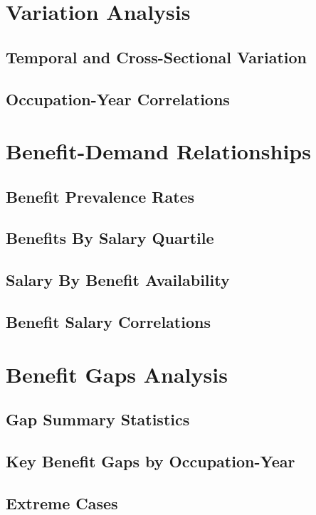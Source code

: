 \documentclass{article}
\begin{document}
\section{Variation Analysis}
\subsection{Temporal and Cross-Sectional Variation}


\subsection{Occupation-Year Correlations}

\section{Benefit-Demand Relationships}
\subsection{Benefit Prevalence Rates}


\subsection{Benefits By Salary Quartile}


\subsection{Salary By Benefit Availability}


\subsection{Benefit Salary Correlations}



\section{Benefit Gaps Analysis}
\subsection{Gap Summary Statistics}


\subsection{Key Benefit Gaps by Occupation-Year}


\subsection{Extreme Cases}

\end{document}
